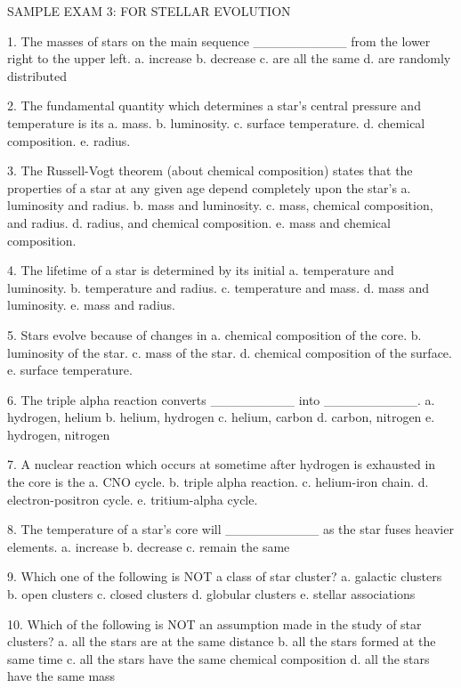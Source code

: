 SAMPLE EXAM 3: FOR STELLAR EVOLUTION
 
   1. The masses of stars on the main sequence __________ from the
      lower right to the upper left.
      a.  increase
      b.  decrease
      c.  are all the same
      d.  are randomly distributed
      
   2. The fundamental quantity which determines a star's central
      pressure and temperature is its
      a.  mass.
      b.  luminosity.
      c.  surface temperature.
      d.  chemical composition.
      e.  radius.
      
   3. The Russell-Vogt theorem (about chemical composition) states that the properties of a star
      at any given age depend completely upon the star's
      a.  luminosity and radius.
      b.  mass and luminosity.
      c.  mass, chemical composition, and radius.
      d.  radius, and chemical composition.
      e.  mass and chemical composition.
      
   4. The lifetime of a star is determined by its initial
      a.  temperature and luminosity.
      b.  temperature and radius.
      c.  temperature and mass.
      d.  mass and luminosity.
      e.  mass and radius.
      
   5. Stars evolve because of changes in
      a.  chemical composition of the core.
      b.  luminosity of the star.
      c.  mass of the star.
      d.  chemical composition of the surface.
      e.  surface temperature.
      
   6. The triple alpha reaction converts _________ into __________.
      a.  hydrogen, helium
      b.  helium, hydrogen
      c.  helium, carbon
      d.  carbon, nitrogen
      e.  hydrogen, nitrogen
      
   7. A nuclear reaction which occurs at sometime after hydrogen is
      exhausted in the core is the
      a.  CNO cycle.
      b.  triple alpha reaction.
      c.  helium-iron chain.
      d.  electron-positron cycle.
      e.  tritium-alpha cycle.
      
 
   8. The temperature of a star's core will __________ as the star
      fuses heavier elements.
      a.  increase
      b.  decrease
      c.  remain the same
      
   9. Which one of the following is NOT a class of star cluster?
      a.  galactic clusters
      b.  open clusters
      c.  closed clusters
      d.  globular clusters
      e.  stellar associations
      
  10. Which of the following is NOT an assumption made in the study
      of star clusters?
      a.  all the stars are at the same distance
      b.  all the stars formed at the same time
      c.  all the stars have the same chemical composition
      d.  all the stars have the same mass
      

